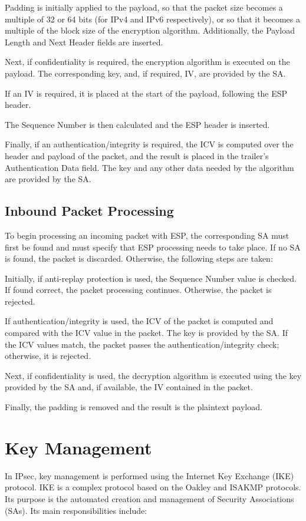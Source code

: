 \begin{outline}[enumerate]
\1 Padding is initially applied to the payload, so that the packet size becomes a multiple of 32 or 64 bits (for IPv4 and IPv6 respectively), or so that it becomes a multiple of the block size of the encryption algorithm. Additionally, the Payload Length and Next Header fields are inserted.

\1 Next, if confidentiality is required, the encryption algorithm is executed on the payload. The corresponding key, and, if required, IV, are provided by the SA.

\1 If an IV is required, it is placed at the start of the payload, following the ESP header.

\1 The Sequence Number is then calculated and the ESP header is inserted.

\1 Finally, if an authentication/integrity is required, the ICV is computed over the header and payload of the packet, and the result is placed in the trailer's Authentication Data field. The key and any other data needed by the algorithm are provided by the SA.
\end{outline}

\subsection{Inbound Packet Processing}
To begin processing an incoming packet with ESP, the corresponding SA must first be found and must specify that ESP processing needs to take place. If no SA is found, the packet is discarded. Otherwise, the following steps are taken:
\begin{outline}[enumerate]
\1 Initially, if anti-replay protection is used, the Sequence Number value is checked. If found correct, the packet processing continues. Otherwise, the packet is rejected.

\1 If authentication/integrity is used, the ICV of the packet is computed and compared with the ICV value in the packet. The key is provided by the SA. If the ICV values match, the packet passes the authentication/integrity check; otherwise, it is rejected.

\1 Next, if confidentiality is used, the decryption algorithm is executed using the key provided by the SA and, if available, the IV contained in the packet.

\1 Finally, the padding is removed and the result is the plaintext payload.
\end{outline}

\section{Key Management}
In IPsec, key management is performed using the Internet Key Exchange (IKE) protocol. IKE is a complex protocol based on the Oakley and ISAKMP protocols. Its purpose is the automated creation and management of Security Associations (SAs). Its main responsibilities include:

